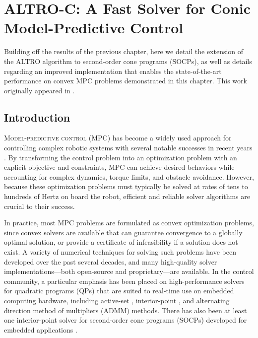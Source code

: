 \documentclass[../root.tex]{subfiles}
\begin{document}
\chapter{ALTRO-C: A Fast Solver for Conic Model-Predictive Control} \label{chap:altro_c}
Building off the results of the previous chapter, here we detail the extension of the
ALTRO algorithm to second-order cone programs (SOCPs), as well as details regarding
an improved implementation that enables the state-of-the-art performance on convex 
MPC problems demonstrated in this chapter. 
This work originally appeared in \cite{jackson_ALTROC_2021}.

\section{Introduction}
    \lettrine{M}{odel-predictive control} 
    (MPC) has become a widely used approach for
    controlling complex robotic systems with several notable successes in
    recent years
    \cite{blackmore_Autonomous_2016,kuindersma_Optimizationbased_2016,carlo_Dynamic_2018}.
    By transforming the control problem into an optimization problem with an
    explicit objective and constraints, MPC can achieve desired behaviors
    while accounting for complex dynamics, torque limits, and obstacle
    avoidance. However, because these optimization problems must typically be
    solved at rates of tens to hundreds of Hertz on board the robot,
    efficient and reliable solver algorithms are crucial to their success.
    
    In practice, most MPC problems are formulated as convex optimization
    problems, since convex solvers are available that can guarantee
    convergence to a globally optimal solution, or provide a certificate of
    infeasibility if a solution does not exist. A variety of numerical
    techniques for solving such problems have been developed over the past
    several decades, and many high-quality solver implementations---both
    open-source and proprietary---are available. In the control community, a
    particular emphasis has been placed on high-performance solvers for
    quadratic programs (QPs) that are suited to real-time use on embedded
    computing hardware, including active-set \cite{ferreau_QpOASES_2014}
    \cite{kuindersma_Efficiently_2014}, interior-point
    \cite{frison_Efficient_2014,frison_Highperformance_2014, frison_HPIPM_2020}, 
    and alternating
    direction method of multipliers (ADMM) \cite{stellato_OSQP_2020} methods. There has
    also been at least one interior-point solver for second-order cone
    programs (SOCPs) developed for embedded applications \cite{domahidi_ECOS_2013}.
   
\end{document}
